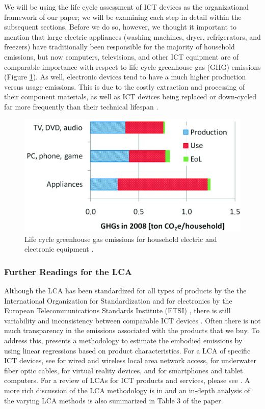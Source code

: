 \documentclass{article}
\begin{document}
We will be using the life cycle assessment of ICT devices as the organizational framework of our paper; we will be examining each step in detail within the subsequent sections. Before we do so, however, we thought it important to mention that large electric appliances (washing machines, dryer, refrigerators, and freezers) have traditionally been responsible for the majority of household emissions, but now computers, televisions, and other ICT equipment are of comparable importance with respect to life cycle greenhouse gas (GHG) emissions (Figure \ref{ICT_devices_LCA}). As well, electronic devices tend to have a much higher production versus usage emissions. This is due to the costly extraction and processing of their component materials, as well as ICT devices being replaced or down-cycled far more frequently than their technical lifespan \cite{hertwich2011greenhouse}.

\begin{figure}[h]
    \includegraphics[width=.8 \textwidth]{./images/ICT_devices_LCA.png}
    \centering
    \caption{Life cycle greenhouse gas emissions for household electric and electronic equipment \cite{hertwich2011greenhouse}.}
    \label{ICT_devices_LCA}
\end{figure}

\subsubsection{Further Readings for the LCA}
Although the LCA has been standardized for all types of products by the the International Organization for Standardization and for electronics by the European Telecommunications Standards Institute (ETSI) \cite{andrae2015life}, there is still variability and inconsistency between comparable ICT devices \cite{andrae2010life}. Often there is not much transparency in the emissions associated with the products that we buy. To address this, \cite{teehan2013comparing} presents a methodology to estimate the embodied emissions by using linear regressions based on product characteristics. For a LCA of specific ICT devices, see \cite{sikdar2013study} for wired and wireless local area network access, \cite{donovan2009twenty} for underwater fiber optic cables, \cite{andrae2017life} for virtual reality devices, and \cite{louis2020sources} for smartphones and tablet computers. For a review of LCAs for ICT products and services, please see \cite{arushanyan2014lessons}. A more rich discussion of the LCA methodology is in \cite{andrae2015life} and an in-depth analysis of the varying LCA methods is also summarized in Table 3 of the paper.
\end{document}
